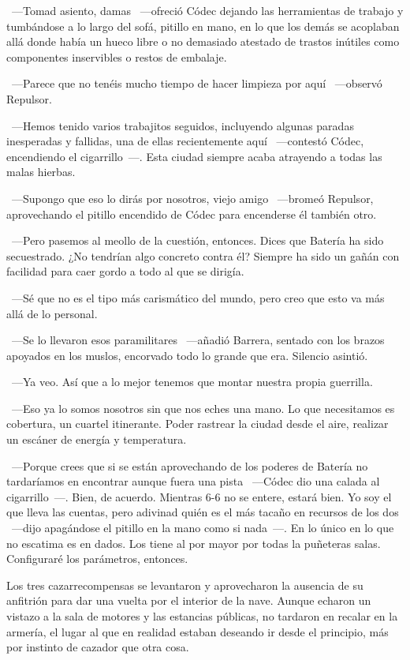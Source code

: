 ~---Tomad asiento, damas ~---ofreció Códec dejando las herramientas de trabajo y tumbándose a lo largo del sofá, pitillo en mano, en lo que los demás se acoplaban allá donde había un hueco libre o no demasiado atestado de trastos inútiles como componentes inservibles o restos de embalaje.

~---Parece que no tenéis mucho tiempo de hacer limpieza por aquí ~---observó Repulsor.

~---Hemos tenido varios trabajitos seguidos, incluyendo algunas paradas inesperadas y fallidas, una de ellas recientemente aquí ~---contestó Códec, encendiendo el cigarrillo~---. Esta ciudad siempre acaba atrayendo a todas las malas hierbas.

~---Supongo que eso lo dirás por nosotros, viejo amigo ~---bromeó Repulsor, aprovechando el pitillo encendido de Códec para encenderse él también otro.

~---Pero pasemos al meollo de la cuestión, entonces. Dices que Batería ha sido secuestrado. ¿No tendrían algo concreto contra él? Siempre ha sido un gañán con facilidad para caer gordo a todo al que se dirigía.

~---Sé que no es el tipo más carismático del mundo, pero creo que esto va más allá de lo personal.

~---Se lo llevaron esos paramilitares ~---añadió Barrera, sentado con los brazos apoyados en los muslos, encorvado todo lo grande que era. Silencio asintió.

~---Ya veo. Así que a lo mejor tenemos que montar nuestra propia guerrilla.

~---Eso ya lo somos nosotros sin que nos eches una mano. Lo que necesitamos es cobertura, un cuartel itinerante. Poder rastrear la ciudad desde el aire, realizar un escáner de energía y temperatura.

~---Porque crees que si se están aprovechando de los poderes de Batería no tardaríamos en encontrar aunque fuera una pista ~---Códec dio una calada al cigarrillo~---. Bien, de acuerdo. Mientras 6-6 no se entere, estará bien. Yo soy el que lleva las cuentas, pero adivinad quién es el más tacaño en recursos de los dos ~---dijo apagándose el pitillo en la mano como si nada~---. En lo único en lo que no escatima es en dados. Los tiene al por mayor por todas la puñeteras salas. Configuraré los parámetros, entonces.

Los tres cazarrecompensas se levantaron y aprovecharon la ausencia de su anfitrión para dar una vuelta por el interior de la nave. Aunque echaron un vistazo a la sala de motores y las estancias públicas, no tardaron en recalar en la armería, el lugar al que en realidad estaban deseando ir desde el principio, más por instinto de cazador que otra cosa.

